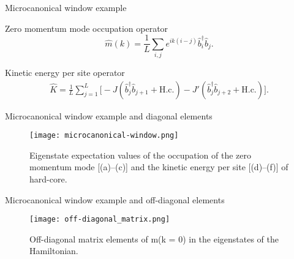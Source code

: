 \begin{frame}{Microcanonical window example}
\begin{block}{Zero momentum mode occupation operator}
\begin{equation}
\hat{m}(k) = \frac{1}{L} \sum_{i,j} e^{ik(i-j)} \hat{b}_i^{\dagger} \hat{b}_j .
\end{equation}
\end{block}

\begin{block}{Kinetic energy per site operator}
\begin{equation}
\begin{split}
\hat{K} = \frac{1}{L} \sum_{j=1}^{L} \Big[
    -J \left( \hat{b}_j^{\dagger} \hat{b}_{j+1} + \text{H.c.} \right)
    - J' \left( \hat{b}_j^{\dagger} \hat{b}_{j+2} + \text{H.c.} \right)
\Big].
\end{split}
\end{equation}
\end{block}

\end{frame}


\begin{frame}{Microcanonical window example and diagonal elements}
\begin{figure}
    \centering
    \texttt{[image: microcanonical-window.png]}
    \caption{Eigenstate expectation values of the occupation of the zero momentum mode [(a)–(c)] and the kinetic
energy per site [(d)–(f)] of hard-core.}
\end{figure}
\end{frame}

\begin{frame}{Microcanonical window example and off-diagonal elements}
\begin{figure}
    \centering\texttt{[image: off-diagonal\_matrix.png]}
    \caption{Off-diagonal matrix elements of m(k = 0) in the eigenstates of the Hamiltonian.}
\end{figure}

\end{frame}